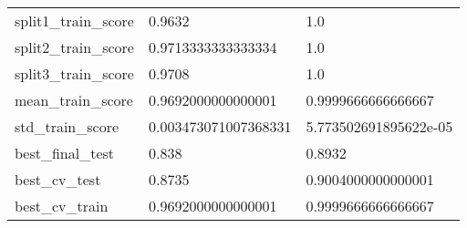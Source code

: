 \begin{tabular}{lll}
split1\_train\_score &                                             0.9632 &                                                1.0 \\
split2\_train\_score &                                 0.9713333333333334 &                                                1.0 \\
split3\_train\_score &                                             0.9708 &                                                1.0 \\
mean\_train\_score   &                                 0.9692000000000001 &                                 0.9999666666666667 \\
std\_train\_score    &                               0.003473071007368331 &                              5.773502691895622e-05 \\
best\_final\_test    &                                              0.838 &                                             0.8932 \\
best\_cv\_test       &                                             0.8735 &                                 0.9004000000000001 \\
best\_cv\_train      &                                 0.9692000000000001 &                                 0.9999666666666667 \\
\bottomrule
\end{tabular}
